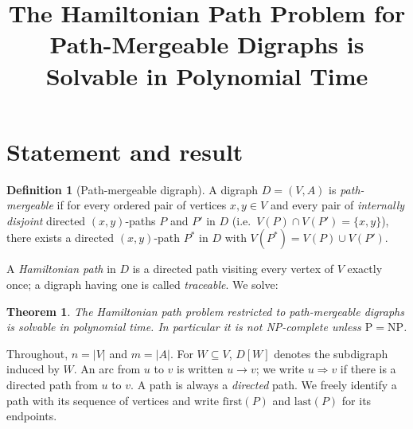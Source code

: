 \documentclass[12pt]{article}
\newtheorem{theorem}{Theorem}
\theoremstyle{definition}
\newtheorem{definition}{Definition}
\newcommand{\Vv}{V}
\newcommand{\Aa}{A}
\begin{document}
\title{The Hamiltonian Path Problem for Path-Mergeable Digraphs is Solvable in Polynomial Time}
\author{}
\date{}
\maketitle

\section{Statement and result}

\begin{definition}[Path-mergeable digraph]
A digraph $D=(\Vv,\Aa)$ is \emph{path-mergeable} if for every ordered pair of
vertices $x,y\in \Vv$ and every pair of \emph{internally disjoint} directed
$(x,y)$-paths $P$ and $P'$ in $D$ (i.e.\ $V(P)\cap V(P')=\{x,y\}$), there exists a
directed $(x,y)$-path $P^{*}$ in $D$ with $V(P^{*})=V(P)\cup V(P')$.
\end{definition}

A \emph{Hamiltonian path} in $D$ is a directed path visiting every vertex of $\Vv$
exactly once; a digraph having one is called \emph{traceable}. We solve:

\begin{theorem}\label{thm:main}
The Hamiltonian path problem restricted to path-mergeable digraphs is solvable in
polynomial time. In particular it is \emph{not} NP-complete unless $\mathrm{P}=\mathrm{NP}$.
\end{theorem}

Throughout, $n=|\Vv|$ and $m=|\Aa|$. For $W\subseteq \Vv$, $D[W]$ denotes the
subdigraph induced by $W$. An arc from $u$ to $v$ is written $u\to v$; we write
$u\Rightarrow v$ if there is a directed path from $u$ to $v$. A path is always a
\emph{directed} path. We freely identify a path with its sequence of vertices and
write $\mathrm{first}(P)$ and $\mathrm{last}(P)$ for its endpoints.
\end{document}

